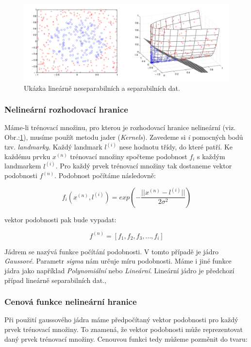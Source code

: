 \documentclass[a4]{article}
\begin{document}
\begin{figure}[!ht]
	\centering
		\includegraphics[width=\textwidth]{images/linear_nonlinear}
	\caption{Ukázka lineárně neseparabilních a separabilních dat.\cite{svm_wiki}}
	\label{fig:linear_nonlinear}
\end{figure}

\subsubsection{Nelineární rozhodovací hranice}
Máme-li trénovací množinu, pro kterou je rozhodovací hranice nelineární (viz. Obr.:\ref{fig:linear_nonlinear}), musíme použít metodu jader (\textit{Kernels}). Zavedeme si \textit{i} pomocných bodů tzv. \textit{landmarky}. Každý landmark $l^{(i)}$ nese hodnotu třídy, do které patří. Ke každému prvku $x^{(n)}$ trénovací množiny spočteme podobnost $f_{i}$ s každým landmarkem $l^{(i)}$. Pro každý prvek trénovací množiny tak dostaneme vektor podobnosti $f^{(n)}$. Podobnost počítáme následovně:

$$f_{i}(x^{(n)},l^{(i)}) = exp(-\frac{||x^{(n)} - l^{(i)}||}{2\sigma^2})$$

vektor podobnosti pak bude vypadat:

$$f^{(n)} = [f_{1},f_{2},f_{3},...,f_{i}]$$

Jádrem se nazývá funkce počítání podobnosti. V tomto případě je jádro \textit{Gaussové}. Parametr \textit{sigma} nám určuje míru podobnosti. Máme i jiné funkce jádra jako například \textit{Polynomiální} nebo \textit{Lineární}. Lineární jádro je předchozí případ lineárně separabilních dat.\cite{svm_robots},\cite{svm_wiki}

\subsubsection{Cenová funkce nelineární hranice}
Při použití gaussového jádra máme předpočítaný vektor podobnosti pro každý prvek trénovací množiny. To znamená, že vektor podobnosti může reprezentovat daný prvek trénovací množiny. Cenouvou funkci tedy můžeme pozměnit do tvaru:
\end{document}
